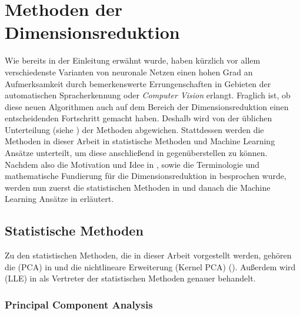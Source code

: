\chapter{Methoden der Dimensionsreduktion}
\label{ch:MethodenDerDimRed}

Wie bereits in der Einleitung erwähnt wurde, haben kürzlich vor allem verschiedenste Varianten von
neuronale Netzen einen hohen Grad an Aufmerksamkeit durch bemerkenswerte Errungenschaften in
Gebieten der automatischen Spracherkennung oder \textit{Computer Vision} erlangt. Fraglich ist, ob
diese neuen Algorithmen auch auf dem Bereich der Dimensionsreduktion einen entscheidenden
Fortschritt gemacht haben. Deshalb wird von der üblichen Unterteilung (siehe
) der Methoden abgewichen. Stattdessen werden die Methoden
in dieser Arbeit in statistische Methoden und Machine Learning Ansätze unterteilt, um diese
anschließend in  gegenüberstellen zu können. Nachdem also die Motivation und
Idee in , sowie die Terminologie und mathematische Fundierung für die
Dimensionsreduktion in  besprochen wurde, werden nun zuerst die
statistischen Methoden in  und danach die Machine Learning
Ansätze in  erläutert.

\section{Statistische Methoden}
\label{ch:MethodenDerDimRed:statistisch}

Zu den statistischen Methoden, die in dieser Arbeit vorgestellt werden, gehören die
 (PCA) in 
und die nichtlineare Erweiterung  (Kernel PCA)
(). Außerdem wird  (LLE) in  als Vertreter der
statistischen Methoden genauer behandelt.

\subsection{Principal Component Analysis}
\label{ch:MethodenDerDimRed:statistisch:PCA}

